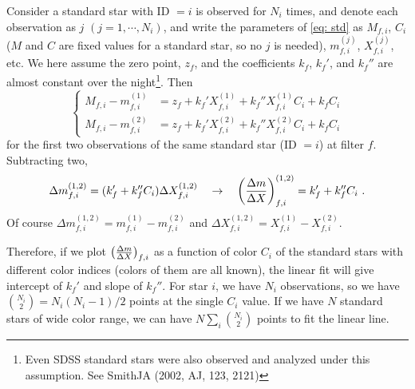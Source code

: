 Consider a standard star with ID $= i $ is observed for $ N_i $ times, and denote each observation as $ j $ $ (j = 1, \cdots, N_i) $, and write the parameters of \cref{eq: std} as $ M_{f, i} $, $ C_{i} $ ($ M $ and $ C $ are fixed values for a standard star, so no $ j $ is needed), $ m_{f, i}^{(j)} $, $ X_{f, i}^{(j)} $, etc. We here assume the zero point, $ z_f $, and the coefficients $ k_f $, $ k_f' $, and $ k_f'' $ are almost constant over the night\footnote{Even SDSS standard stars were also observed and analyzed under this assumption. See SmithJA (2002, AJ, 123, 2121)}. Then
\begin{equation}
\begin{cases}
  M_{f, i} - m_{f, i}^{(1)}
    &= z_f + k_f' X_{f, i}^{(1)} + k_f'' X_{f, i}^{(1)} C_{i} + k_f C_{i} \\
  M_{f, i} - m_{f, i}^{(2)}
    &= z_f + k_f' X_{f, i}^{(2)} + k_f'' X_{f, i}^{(2)} C_{i} + k_f C_{i}
\end{cases}
\end{equation}
for the first two observations of the same standard star (ID $= i $) at filter $ f $. Subtracting two,
\begin{equation}
  \Delta m_{f, i}^{(1, 2)} 
    = (k_f' + k_f'' C_i) \Delta X_{f, i}^{(1, 2)} 
  \quad\rightarrow\quad
  \qty( \frac{\Delta m }{\Delta X} )_{f, i}^{(1, 2)}
    = k_f' + k_f'' C_i ~.
\end{equation}
Of course $ \Delta m_{f, i}^{(1, 2)}  = m_{f, i}^{(1)} - m_{f, i}^{(2)} $ and $ \Delta X_{f, i}^{(1, 2)}  = X_{f, i}^{(1)} - X_{f, i}^{(2)} $. 

Therefore, if we plot $ \qty ( \frac{\Delta m }{\Delta X} )_{f, i} $ as a function of color $ C_i $ of the standard stars with different color indices (colors of them are all known), the linear fit will give intercept of $ k_f' $ and slope of $ k_f'' $. For star $ i $, we have $ N_i $ observations, so we have $ \binom{N_i}{2} = N_i (N_i - 1) / 2 $ points at the single $ C_i $ value. If we have $ N $ standard stars of wide color range, we can have $ N \sum_i \binom{N_i}{2} $ points to fit the linear line.
